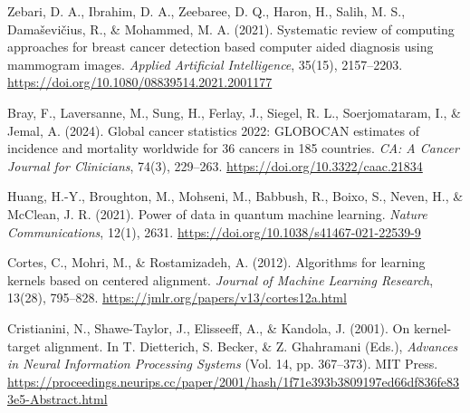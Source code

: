 
    Zebari, D. A., Ibrahim, D. A., Zeebaree, D. Q., Haron, H., Salih, M. S., Dama\v{s}evi\v{c}ius, R., \& Mohammed, M. A. (2021).
    Systematic review of computing approaches for breast cancer detection based computer aided diagnosis using mammogram images.
    \textit{Applied Artificial Intelligence}, 35(15), 2157--2203.
    \url{https://doi.org/10.1080/08839514.2021.2001177}

    Bray, F., Laversanne, M., Sung, H., Ferlay, J., Siegel, R. L., Soerjomataram, I., \& Jemal, A. (2024).
    Global cancer statistics 2022: GLOBOCAN estimates of incidence and mortality worldwide for 36 cancers in 185 countries.
    \textit{CA: A Cancer Journal for Clinicians}, 74(3), 229--263.
    \url{https://doi.org/10.3322/caac.21834}

    Huang, H.-Y., Broughton, M., Mohseni, M., Babbush, R., Boixo, S., Neven, H., \& McClean, J. R. (2021).
    Power of data in quantum machine learning.
    \textit{Nature Communications}, 12(1), 2631.
    \url{https://doi.org/10.1038/s41467-021-22539-9}

    Cortes, C., Mohri, M., \& Rostamizadeh, A. (2012).
    Algorithms for learning kernels based on centered alignment.
    \textit{Journal of Machine Learning Research}, 13(28), 795--828.
    \url{https://jmlr.org/papers/v13/cortes12a.html}

    Cristianini, N., Shawe-Taylor, J., Elisseeff, A., \& Kandola, J. (2001).
    On kernel-target alignment. In T. Dietterich, S. Becker, \& Z. Ghahramani (Eds.),
    \textit{Advances in Neural Information Processing Systems} (Vol. 14, pp. 367--373). MIT Press.
    \url{https://proceedings.neurips.cc/paper/2001/hash/1f71e393b3809197ed66df836fe833e5-Abstract.html}

